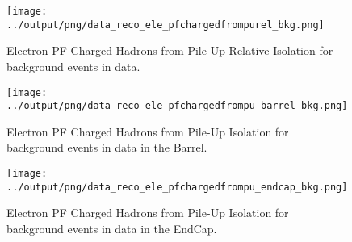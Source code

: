 \documentclass[11pt]{book}
\begin{document}
\begin{figure}[htb]
\centering
\texttt{[image: ../output/png/data\_reco\_ele\_pfchargedfrompurel\_bkg.png]}
\caption{Electron PF Charged Hadrons from Pile-Up Relative Isolation for background events in data.}
\label{fig:data_ele_pfchargedfrompurel_bkg}
\end{figure}

\begin{figure}[htb]
\centering
\texttt{[image: ../output/png/data\_reco\_ele\_pfchargedfrompu\_barrel\_bkg.png]}
\caption{Electron PF Charged Hadrons from Pile-Up Isolation for background events in data in the Barrel.}
\label{fig:data_ele_pfchargedfrompu_barrel_bkg}
\end{figure}

\begin{figure}[htb]
\centering
\texttt{[image: ../output/png/data\_reco\_ele\_pfchargedfrompu\_endcap\_bkg.png]}
\caption{Electron PF Charged Hadrons from Pile-Up Isolation for background events in data in the EndCap.}
\label{fig:data_ele_pfchargedfrompu_endcap_bkg}
\end{figure}
\end{document}
